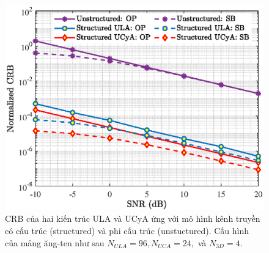 \begin{figure}[!b]
    \centering
    \includegraphics[width=\linewidth]{figures/fig_1_3.eps}
    \caption{CRB của hai kiến trúc ULA và UCyA ứng với mô hình kênh truyền có cấu trúc (structured) và phi cấu trúc (unstuctured). Cấu hình của mảng ăng-ten như sau $N_{ULA} = 96, N_{UCA} = 24,$ và $N_{3D} = 4$.}
    \label{fig:op}
\end{figure}

